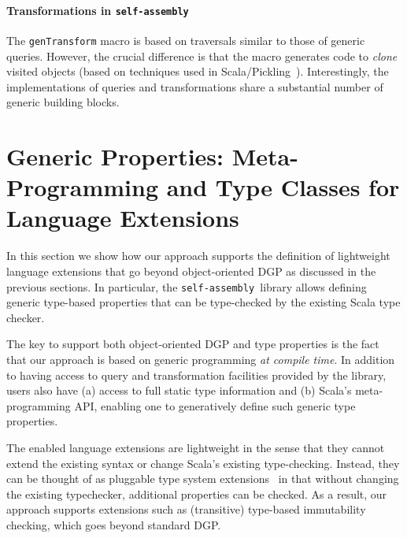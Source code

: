 \documentclass[preprint,nocopyrightspace]{sigplanconf}
\newcommand{\selfassembly}{\texttt{self-assembly~}}
\begin{document}
\paragraph{Transformations in \selfassembly}
The \verb|genTransform| macro is based on traversals similar to those of
generic queries. However, the crucial difference is that the macro generates
code to {\em clone} visited objects (based on techniques used in
Scala/Pickling~\cite{Pickling}). Interestingly, the implementations of queries and
transformations share a substantial number of generic building blocks.


\section{Generic Properties: Meta-Programming and Type Classes for Language Extensions}
\label{sec:language-extensions}

In this section we show how our approach supports the definition of
lightweight language extensions that go beyond object-oriented DGP as
discussed in the previous sections. In particular, the \selfassembly library
allows defining generic type-based properties that can be type-checked by the
existing Scala type checker.


The key to support both object-oriented DGP and type properties is the fact
that our approach is based on generic programming {\em at compile time}. In
addition to having access to query and transformation facilities provided by
the library, users also have (a) access to full static type information and
(b) Scala's meta-programming API, enabling one to generatively define such
generic type properties.

The enabled language extensions are lightweight in the sense that they cannot
extend the existing syntax or change Scala’s existing type-checking. Instead,
they can be thought of as pluggable type system
extensions~\cite{PluggableTypes} in that without changing the existing
typechecker, additional properties can be checked. As a result, our approach
supports extensions such as (transitive) type-based immutability checking,
which goes beyond standard DGP.
\end{document}
